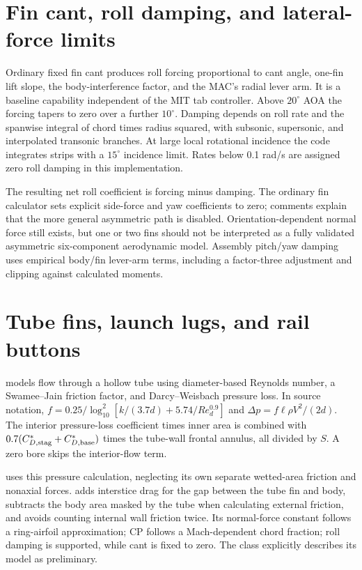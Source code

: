\section{Fin cant, roll damping, and lateral-force limits}
Ordinary fixed fin cant produces roll forcing proportional to cant angle, one-fin lift slope, the body-interference factor, and the MAC's radial lever arm. It is a baseline capability independent of the MIT tab controller. Above $20^\circ$ AOA the forcing tapers to zero over a further $10^\circ$. Damping depends on roll rate and the spanwise integral of chord times radius squared, with subsonic, supersonic, and interpolated transonic branches. At large local rotational incidence the code integrates strips with a $15^\circ$ incidence limit. Rates below 0.1 rad/s are assigned zero roll damping in this implementation.

The resulting net roll coefficient is forcing minus damping. The ordinary fin calculator sets explicit side-force and yaw coefficients to zero; comments explain that the more general asymmetric path is disabled. Orientation-dependent normal force still exists, but one or two fins should not be interpreted as a fully validated asymmetric six-component aerodynamic model. Assembly pitch/yaw damping uses empirical body/fin lever-arm terms, including a factor-three adjustment and clipping against calculated moments.


\section{Tube fins, launch lugs, and rail buttons}
 models flow through a hollow tube using diameter-based Reynolds number, a Swamee--Jain friction factor, and Darcy--Weisbach pressure loss. In source notation, $f=0.25/\log_{10}^2[k/(3.7d)+5.74/Re_d^{0.9}]$ and $\Delta p=f\ell\rho V^2/(2d)$. The interior pressure-loss coefficient times inner area is combined with $0.7(C_{D,\rm stag}^{*}+C_{D,\rm base}^{*})$ times the tube-wall frontal annulus, all divided by $S$. A zero bore skips the interior-flow term.

 uses this pressure calculation, neglecting its own separate wetted-area friction and nonaxial forces.  adds interstice drag for the gap between the tube fin and body, subtracts the body area masked by the tube when calculating external friction, and avoids counting internal wall friction twice. Its normal-force constant follows a ring-airfoil approximation; CP follows a Mach-dependent chord fraction; roll damping is supported, while cant is fixed to zero. The class explicitly describes its model as preliminary.


